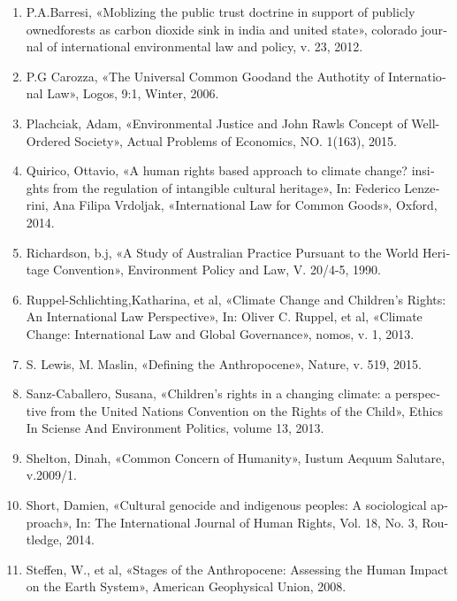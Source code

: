 {\begin{latin}
{\begin{enumerate}
		\item P.A.Barresi, «Moblizing the public trust doctrine in support of publicly ownedforests as carbon dioxide sink in india and united state», colorado journal of international environmental law and policy, v. 23, 2012.
		
		\item P.G Carozza, «The Universal Common Goodand the Authotity of International Law», Logos, 9:1, Winter, 2006.
		
		\item Plachciak, Adam, «Environmental Justice and John Rawls Concept of Well-Ordered Society», Actual Problems of Economics, NO. 1(163), 2015.
		
		\item Quirico, Ottavio, «A human rights based approach to climate change? insights from the regulation of intangible cultural heritage», In: Federico Lenzerini, Ana Filipa Vrdoljak, «International Law for Common Goods», Oxford, 2014.
		
		\item Richardson, b.j, «A Study of Australian Practice Pursuant to the World Heritage Convention», Environment Policy and Law,  V. 20/4-5, 1990.
		
		
		
		\item Ruppel-Schlichting,Katharina, et al, «Climate Change and Children’s Rights: An International Law Perspective»,  In: Oliver C. Ruppel, et al, «Climate Change: International Law and Global Governance», nomos, v. 1, 2013.
		
		\item S. Lewis, M. Maslin, «Defining the Anthropocene», Nature,  v. 519, 2015.
		
		
		\item Sanz-Caballero, Susana, «Children’s rights in a changing climate: a perspective from the United Nations Convention on the Rights of the Child», Ethics In Sciense And Environment Politics, volume 13, 2013.
		
		
		
		\item Shelton, Dinah, «Common Concern of Humanity», Iustum Aequum Salutare, v.2009/1.
		
		\item Short, Damien, «Cultural genocide and indigenous peoples: A sociological approach», In: The International Journal of Human Rights, Vol. 18, No. 3, Routledge, 2014.
		
		\item Steffen, W., et al, «Stages of the Anthropocene: Assessing the Human Impact on the Earth System», American Geophysical Union, 2008.
		

\end{enumerate}}
\end{latin}}
